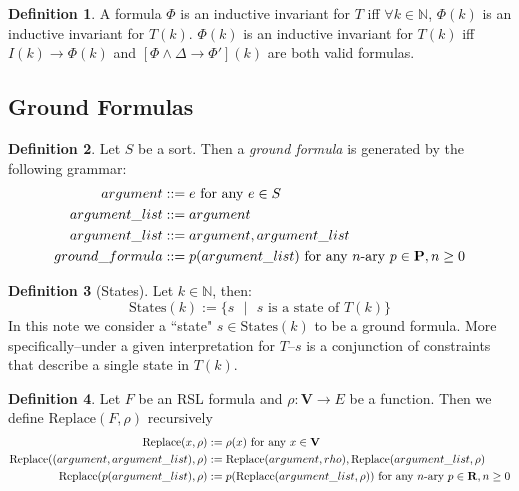\documentclass[12pt]{article}
\theoremstyle{definition}
\newtheorem{definition}{Definition}
\theoremstyle{remark}
\newcommand{\st}{\text{ }|\text{ }}
\newcommand{\states}{\text{States}}
\newcommand{\replace}{\text{Replace}}
\begin{document}
\begin{definition}
  A formula $\Phi$ is an inductive invariant for $T$ iff $\forall k \in \mathbb{N}$, $\Phi(k)$ is an inductive invariant for $T(k)$.  $\Phi(k)$ is an inductive invariant for $T(k)$ iff $I(k) \rightarrow \Phi(k)$ and $[\Phi \land \Delta \rightarrow \Phi'](k)$ are both valid formulas.
\end{definition}


\subsection{Ground Formulas}

\begin{definition}
  Let $S$ be a sort.  Then a \textit{ground formula} is generated by the following grammar:
  \begin{align*}
    argument &::= e \hfill \text{ for any } e \in S\\
    argument\_list &::= argument\\
    argument\_list &::= argument,argument\_list\\
    ground\_formula &::= p(argument\_list) \hfill \text{ for any } n\text{-ary } p \in \mathbf{P}, n \geq 0\\
  \end{align*}
\end{definition}

\begin{definition}[States]
  Let $k \in \mathbb{N}$, then:
  $$\states(k) := \{s \st s \text{ is a state of } T(k)\}$$
  In this note we consider a ``state" $s \in \states(k)$ to be a ground formula.  More specifically--under a given interpretation for $T$--$s$ is a conjunction of constraints that describe a single state in $T(k)$.
\end{definition}

\begin{definition}
  Let $F$ be an RSL formula and $\rho : \mathbf{V} \to E$ be a function.  Then we define $\replace(F,\rho)$ recursively
  \begin{align*}
    \replace(x,\rho) &:= \rho(x) \hfill \text{ for any } x \in \mathbf{V}\\
    \replace((argument,argument\_list),\rho) &:= \replace(argument,rho), \replace(argument\_list,\rho)\\
    \replace(p(argument\_list),\rho) &:= p(\replace(argument\_list,\rho)) \hfill \text{ for any } n\text{-ary } p \in \mathbf{R}, n \geq 0\\
  \end{align*}
\end{definition}
\end{document}

